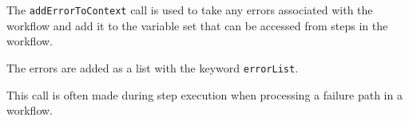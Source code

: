 The \verb+addErrorToContext+ call is used to take any errors associated with the workflow
and add it to the variable set that can be accessed from steps in the workflow.

The errors are added as a list with the keyword \verb+errorList+.

This call is often made during step execution when processing a failure path in a workflow.
